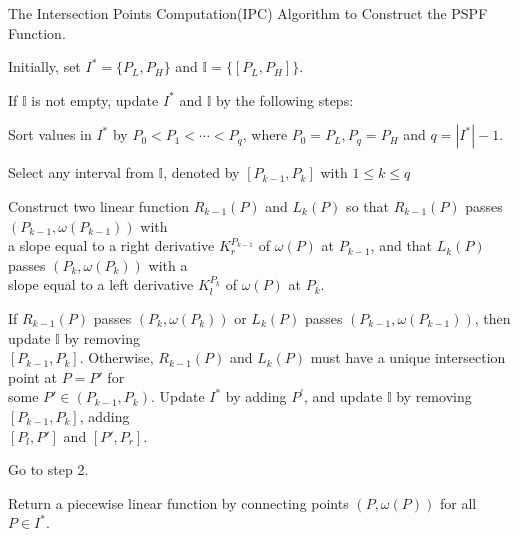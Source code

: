\begin{algorithm}[h]\label{algoIPC}
\caption{The Intersection Points Computation(IPC) Algorithm to Construct the PSPF Function.}
\begin{algorithmic}[1]

\begin{description}
  \justifying
  \item[Step 1.] Initially, set $I^*=\{P_L,P_H\}$ and $\mathbb{I}= \{[P_L,P_H]\}$.
  \item[Step 2.] If $\mathbb{I}$ is not empty, update $I^*$ and $\mathbb{I}$ by the following steps:
  \item[Step 3.] Sort values in $I^*$ by $P_0<P_1<\cdots<P_q$, where $P_0 = P_L,P_q = P_H$ and $q = |I^*|-1$.
  \item[Step 4.]
  Select any interval from $\mathbb{I}$, denoted by $[P_{k-1},P_{k}]$ with $1\leq k \leq q$
  \item[Step 5.]
  Construct two linear function $ R_{k-1}(P)$ and $ L_{k}(P)$ so that $ R_{k-1}(P)$ passes $(P_{k-1},\omega(P_{k-1}))$ with \\
  \vspace{10pt}
  a slope equal to a right derivative $K_{r}^{P_{k-1}}$ of $\omega(P)$ at $P_{k-1}$, and that $L_{k}(P)$ passes $(P_{k},\omega(P_{k}))$ with a \\
  \vspace{10pt}
  slope equal to a left derivative $K_{l}^{P_{k}}$
  of $\omega(P)$ at $P_k$.
  \item[Step 6.] If $R_{k-1}(P)$ passes $(P_{k},\omega(P_{k}))$ or $L_{k}(P)$ passes $(P_{k-1},\omega(P_{k-1}))$, then update $\mathbb{I}$ by removing \\

  $[P_{k-1},P_{k}]$. Otherwise, $R_{k-1}(P)$ and $L_{k}(P)$ must have a unique intersection point at $P=P'$ for  \\
  \vspace{10pt}
  some $P' \in (P_{k-1},P_{k})$.
  Update $I^*$ by adding $P^'$, and update $\mathbb{I}$ by removing $[P_{k-1},P_{k}]$, adding \\
  \vspace{10pt}
  $[P_l,P']$ and $[P',P_r]$.
  \item[Step 7.] Go to step 2.
  \item[Step 8.] Return a piecewise linear function by connecting points $(P,\omega(P))$ for all $P \in I^*$.

\end{description}
\end{algorithmic}
\end{algorithm}

